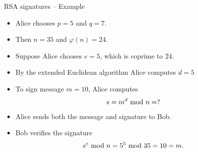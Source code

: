 \begin{frame}{RSA signatures -- Example}
\begin{example}
\begin{itemize}
    \item Alice chooses $p=5$ and $q=7$.
    \item Then $n=35$ and $\varphi(n)=24$.
    \item Suppose Alice chooses $e=5$, which is coprime to $24$.
    \item  By the extended Euclidean algorithm Alice computes $d=5$
     \item To sign message $m=10$, Alice computes
    \[
    s=m^d\textrm{~mod~} n=?
    \]
    \item Alice sends both the message and signature to Bob.
    \item Bob verifies the signature
    \[
    s^e\textrm{~mod~} n= 5^5\textrm{~mod~} 35 = 10 = m.
    \]
\end{itemize}
\end{example}
\end{frame}